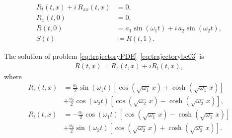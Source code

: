 \documentclass[10pt,a4paper]{amsart}
\begin{document}
\begin{align}
    R_{t}(t,x) + i\,R_{xx}(t,x) &= 0, \label{eq:trajectoryPDE}\\
    R_{x}(t,0) &= 0, \label{eq:trajectorybc0}\\
    R(t,0) &= a_{1}\sin(\omega_{1} t) +i\,a_{2}\sin(\omega_{2} t), \label{eq:trajectorybc03}\\
    S(t) &\coloneqq R(t,1). \label{eq:perturbation}
\end{align}

\begin{lemma}
    The solution of problem \eqref{eq:trajectoryPDE}--\eqref{eq:trajectorybc03} is 
    \begin{align*}
        R(t,x) = R_r(t,x) + iR_{i}(t,x),
    \end{align*}
    \noindent where
\begin{align*}
    R_r(t,x) &= \frac{a_{1}}{2}\sin (\omega_{1}t)\left[\cos (\sqrt{\omega_{1}}\, x)+\cosh(\sqrt{\omega_{1}}\, x)\right] \\
    & + \frac{a_{2}}{2}\cos (\omega_{2}t)\left[\cos (\sqrt{\omega_{2}}\, x) - \cosh(\sqrt{\omega_{2}}\, x)\right],\\
    R_i(t,x) &= -\frac{a_{1}}{2}\cos (\omega_{1}t)\left[\cos (\sqrt{\omega_{1}}\, x)-\cosh(\sqrt{\omega_{1}}\, x)\right] \\
    & + \frac{a_{2}}{2}\sin (\omega_{2}t)\left[\cos (\sqrt{\omega_{2}}\, x)+\cosh(\sqrt{\omega_{2}}\, x)\right].
\end{align*}
\end{lemma}
\end{document}
